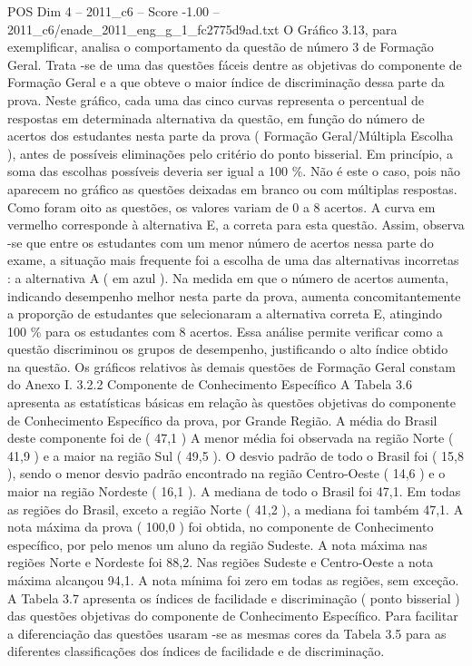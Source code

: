 \begin{textsample}{POS Dim 4 – 2011\_c6 – Score -1.00 – 2011\_c6/enade\_2011\_eng\_g\_1\_fc2775d9ad.txt}
O Gráfico 3.13, para exemplificar, analisa o comportamento da questão de número 3 de Formação Geral.
Trata -se de uma das questões fáceis dentre as objetivas do componente de Formação Geral e a que obteve o maior índice de discriminação dessa parte da prova.
Neste gráfico, cada uma das cinco curvas representa o percentual de respostas em determinada alternativa da questão, em função do número de acertos dos estudantes nesta parte da prova ( Formação Geral/Múltipla Escolha ), antes de possíveis eliminações pelo critério do ponto bisserial.
Em princípio, a soma das escolhas possíveis deveria ser igual a 100 \%.
Não é este o caso, pois não aparecem no gráfico as questões deixadas em branco ou com múltiplas respostas.
Como foram oito as questões, os valores variam de 0 a 8 acertos.
A curva em vermelho corresponde à alternativa E, a correta para esta questão.
Assim, observa -se que entre os estudantes com um menor número de acertos nessa parte do exame, a situação mais frequente foi a escolha de uma das alternativas incorretas : a alternativa A ( em azul ).
Na medida em que o número de acertos aumenta, indicando desempenho melhor nesta parte da prova, aumenta concomitantemente a proporção de estudantes que selecionaram a alternativa correta E, atingindo 100 \% para os estudantes com 8 acertos.
Essa análise permite verificar como a questão discriminou os grupos de desempenho, justificando o alto índice obtido na questão.
Os gráficos relativos às demais questões de Formação Geral constam do Anexo I. 3.2.2 Componente de Conhecimento Específico A Tabela 3.6 apresenta as estatísticas básicas em relação às questões objetivas do componente de Conhecimento Específico da prova, por Grande Região.
A média do Brasil deste componente foi de ( 47,1 ) A menor média foi observada na região Norte ( 41,9 ) e a maior na região Sul ( 49,5 ).
O desvio padrão de todo o Brasil foi ( 15,8 ), sendo o menor desvio padrão encontrado na região Centro-Oeste ( 14,6 ) e o maior na região Nordeste ( 16,1 ).
A mediana de todo o Brasil foi 47,1.
Em todas as regiões do Brasil, exceto a região Norte ( 41,2 ), a mediana foi também 47,1.
A nota máxima da prova ( 100,0 ) foi obtida, no componente de Conhecimento específico, por pelo menos um aluno da região Sudeste.
A nota máxima nas regiões Norte e Nordeste foi 88,2.
Nas regiões Sudeste e Centro-Oeste a nota máxima alcançou 94,1.
A nota mínima foi zero em todas as regiões, sem exceção.
A Tabela 3.7 apresenta os índices de facilidade e discriminação ( ponto bisserial ) das questões objetivas do componente de Conhecimento Específico.
Para facilitar a diferenciação das questões usaram -se as mesmas cores da Tabela 3.5 para as diferentes classificações dos índices de facilidade e de discriminação.

\end{textsample}
